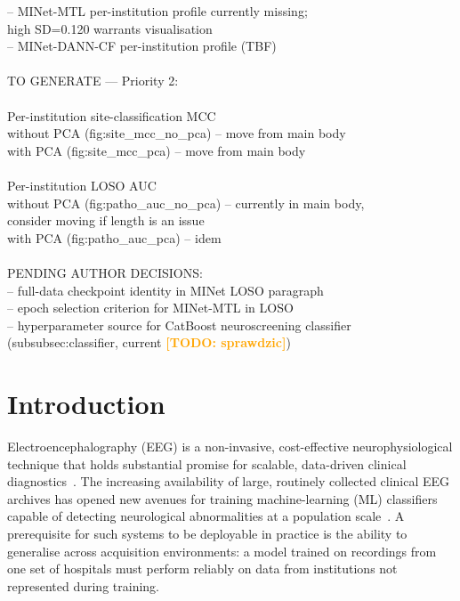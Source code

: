 \documentclass[preprint,12pt]{elsarticle}
\newcommand{\td}[1]{\textcolor{orange}{\textbf{[TODO: #1]}}}
\begin{document}
{{\quad\quad -- MINet-MTL per-institution profile currently missing;\\
\quad\quad\quad high SD=0.120 warrants visualisation\\
\quad\quad -- MINet-DANN-CF per-institution profile (TBF)\\
\\
TO GENERATE --- Priority 2:\\
\\
\quad [Appendix] Per-institution site-classification MCC\\
\quad\quad without PCA (fig:site\_mcc\_no\_pca) -- move from main body\\
\quad\quad with PCA (fig:site\_mcc\_pca) -- move from main body\\
\\
\quad [Appendix] Per-institution LOSO AUC\\
\quad\quad without PCA (fig:patho\_auc\_no\_pca) -- currently in main body,\\
\quad\quad\quad consider moving if length is an issue\\
\quad\quad with PCA (fig:patho\_auc\_pca) -- idem\\
\\
PENDING AUTHOR DECISIONS:\\
\quad -- full-data checkpoint identity in MINet LOSO paragraph\\
\quad -- epoch selection criterion for MINet-MTL in LOSO\\
\quad -- hyperparameter source for CatBoost neuroscreening classifier\\
\quad\quad (subsubsec:classifier, current \td{sprawdzic})\\
}}





\section{Introduction}
\label{sec:introduction}

Electroencephalography (EEG) is a non-invasive, cost-effective
neurophysiological technique that holds substantial promise for
scalable, data-driven clinical diagnostics~\cite{poziomska2026quantity}.
The increasing availability of large, routinely collected clinical EEG
archives has opened new avenues for training machine-learning (ML)
classifiers capable of detecting neurological abnormalities at a
population scale~\cite{mushtaq2025eeg}.
A prerequisite for such systems to be deployable in practice is the
ability to generalise across acquisition environments: a model trained
on recordings from one set of hospitals must perform reliably on data
from institutions not represented during training.
\end{document}
